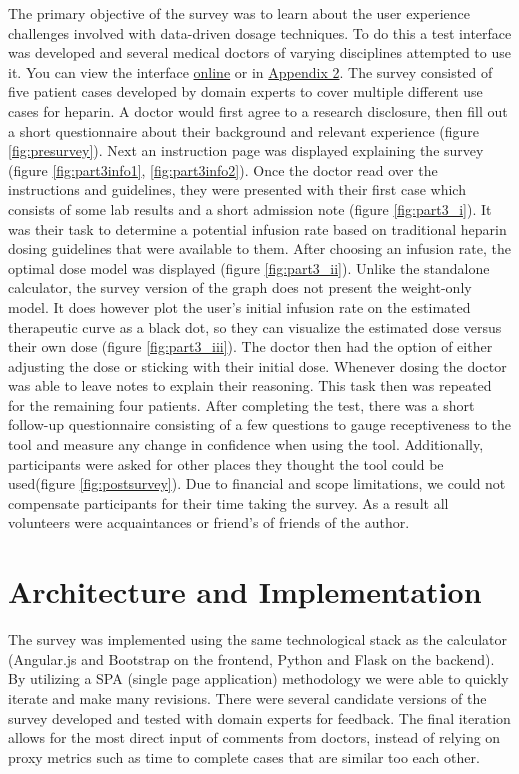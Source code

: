 \documentclass[12pt,a4paper,]{report}
\begin{document}
The primary objective of the survey was to learn about the user
experience challenges involved with data-driven dosage techniques. To do
this a test interface was developed and several medical doctors of
varying disciplines attempted to use it. You can view the interface
\href{https://hepstack-stage.herokuapp.com/}{online} or in
\protect\hyperlink{appendix-2-application-user-interface}{Appendix 2}.
The survey consisted of five patient cases developed by domain experts
to cover multiple different use cases for heparin. A doctor would first
agree to a research disclosure, then fill out a short questionnaire
about their background and relevant experience (figure
\ref{fig:presurvey}). Next an instruction page was displayed explaining
the survey (figure \ref{fig:part3info1}, \ref{fig:part3info2}). Once the
doctor read over the instructions and guidelines, they were presented
with their first case which consists of some lab results and a short
admission note (figure \ref{fig:part3_i}). It was their task to
determine a potential infusion rate based on traditional heparin dosing
guidelines that were available to them. After choosing an infusion rate,
the optimal dose model was displayed (figure \ref{fig:part3_ii}). Unlike
the standalone calculator, the survey version of the graph does not
present the weight-only model. It does however plot the user's initial
infusion rate on the estimated therapeutic curve as a black dot, so they
can visualize the estimated dose versus their own dose (figure
\ref{fig:part3_iii}). The doctor then had the option of either adjusting
the dose or sticking with their initial dose. Whenever dosing the doctor
was able to leave notes to explain their reasoning. This task then was
repeated for the remaining four patients. After completing the test,
there was a short follow-up questionnaire consisting of a few questions
to gauge receptiveness to the tool and measure any change in confidence
when using the tool. Additionally, participants were asked for other
places they thought the tool could be used(figure \ref{fig:postsurvey}).
Due to financial and scope limitations, we could not compensate
participants for their time taking the survey. As a result all
volunteers were acquaintances or friend's of friends of the author.

\section{Architecture and
Implementation}\label{architecture-and-implementation}

The survey was implemented using the same technological stack as the
calculator (Angular.js and Bootstrap on the frontend, Python and Flask
on the backend). By utilizing a SPA (single page application)
methodology we were able to quickly iterate and make many revisions.
There were several candidate versions of the survey developed and tested
with domain experts for feedback. The final iteration allows for the
most direct input of comments from doctors, instead of relying on proxy
metrics such as time to complete cases that are similar too each other.
\end{document}
